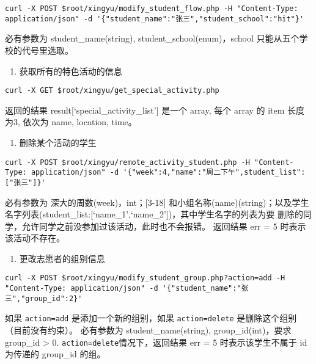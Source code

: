 \documentclass[]{article}
\providecommand{\tightlist}{%
  \setlength{\itemsep}{0pt}\setlength{\parskip}{0pt}}
\begin{document}
\begin{verbatim}
curl -X POST $root/xingyu/modify_student_flow.php -H "Content-Type: application/json" -d '{"student_name":"张三","student_school":"hit"}'
\end{verbatim}

必有参数为 student\_name(string), student\_school(enum)，school
只能从五个学校的代号里选取。

\begin{enumerate}
\def\labelenumi{\arabic{enumi}.}
\setcounter{enumi}{8}
\tightlist
\item
  获取所有的特色活动的信息
\end{enumerate}

\begin{verbatim}
curl -X GET $root/xingyu/get_special_activity.php
\end{verbatim}

返回的结果 result{[}`special\_activity\_list'{]} 是一个 array, 每个
array 的 item 长度为3, 依次为 name, location, time。

\begin{enumerate}
\def\labelenumi{\arabic{enumi}.}
\setcounter{enumi}{9}
\tightlist
\item
  删除某个活动的学生
\end{enumerate}

\begin{verbatim}
curl -X POST $root/xingyu/remote_activity_student.php -H "Content-Type: application/json" -d '{"week":4,"name":"周二下午",student_list":["张三"]}'
\end{verbatim}

必有参数为 深大的周数(week)，int；{[}3-18{]}
和小组名称(name)(string)；以及学生名字列表(student\_list:{[}`name\_1',`name\_2'{]})，其中学生名字的列表为要
删除的同学，允许同学之前没参加过该活动，此时也不会报错。 返回结果 err =
5 时表示该活动不存在。

\begin{enumerate}
\def\labelenumi{\arabic{enumi}.}
\setcounter{enumi}{10}
\tightlist
\item
  更改志愿者的组别信息
\end{enumerate}

\begin{verbatim}
curl -X POST $root/xingyu/modify_student_group.php?action=add -H "Content-Type: application/json" -d '{"student_name":"张三","group_id":2}'
\end{verbatim}

如果 \texttt{action=add} 是添加一个新的组别，如果 \texttt{action=delete}
是删除这个组别（目前没有约束）。 必有参数为 student\_name(string),
group\_id(int)，要求 group\_id \textgreater{} 0.
\texttt{action=delete}情况下，返回结果 err = 5 时表示该学生不属于 id
为传递的 group\_id 的组。
\end{document}
